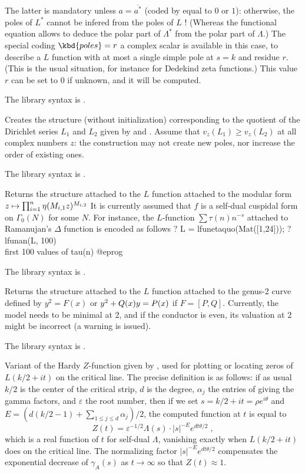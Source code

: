 The latter is mandatory unless $a = \overline{a^*}$ (coded by 
equal to $0$ or $1$): otherwise, the poles of $L^*$ cannot be infered from
the poles of $L$ ! (Whereas the functional equation allows to deduce
the polar part of $\Lambda^*$ from the polar part of $\Lambda$.)
The special coding $\kbd{poles} = r$ a complex scalar is available in this
case, to describe a $L$ function with at most a single simple pole at $s =
k$ and residue $r$. (This is the usual situation, for instance for Dedekind
zeta functions.) This value $r$ can be set to $0$ if unknown, and it will be
computed.

The library syntax is .

\label{se:lfundiv}
Creates the  structure (without initialization) corresponding
 to the quotient of the Dirichlet series $L_1$ and $L_2$ given by
 and . Assume that $v_z(L_1) \geq v_z(L_2)$ at all
complex numbers $z$: the construction may not create new poles, nor increase
the order of existing ones.

The library syntax is .

\label{se:lfunetaquo}
Returns the  structure attached to the $L$ function
attached to the modular form
$z\mapsto \prod_{i=1}^n \eta(M_{i,1}\*z)^{M_{i,2}}$
It is currently assumed that $f$ is a self-dual cuspidal form on
$\Gamma_0(N)$ for some $N$.
For instance, the $L$-function $\sum \tau(n) n^{-s}$
attached to Ramanujan's $\Delta$ function is encoded as follows
\bprog
? L = lfunetaquo(Mat([1,24]));
? lfunan(L, 100)  \\ first 100 values of tau(n)
@eprog

The library syntax is .

\label{se:lfungenus2}
Returns the  structure attached to the $L$ function
attached to the genus-2 curve defined by $y^2=F(x)$ or
$y^2+Q(x)\*y=P(x)$ if $F=[P,Q]$.
Currently, the model needs to be minimal at 2, and if the conductor
is even, its valuation at $2$ might be incorrect (a warning is issued).

The library syntax is .

\label{se:lfunhardy}
Variant of the Hardy $Z$-function given by , used for
plotting or locating zeros of $L(k/2+it)$ on the critical line.
The precise definition is as
follows: if as usual $k/2$ is the center of the critical strip, $d$ is the
degree, $\alpha_j$ the entries of  giving the gamma factors,
and $\varepsilon$ the root number, then if we set
$s = k/2+it = \rho e^{i\theta}$ and
$E=(d(k/2-1)+\sum_{1\le j\le d}\alpha_j)/2$, the computed function at $t$ is
equal to
$$Z(t) = \varepsilon^{-1/2}\Lambda(s) \cdot |s|^{-E}e^{dt\theta/2}\;,$$
which is a real function of $t$ for self-dual $\Lambda$,
vanishing exactly when $L(k/2+it)$ does on the critical line. The
normalizing factor $|s|^{-E}e^{dt\theta/2}$ compensates the
exponential decrease of $\gamma_A(s)$ as $t\to\infty$ so that
$Z(t) \approx 1$.

